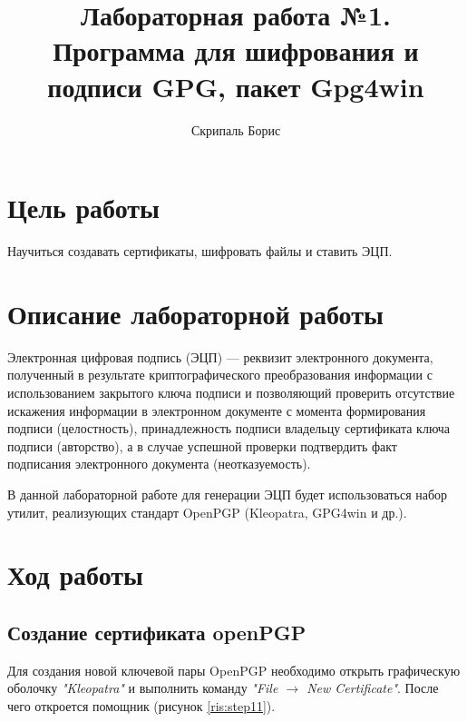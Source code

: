 \documentclass[10pt,a4paper]{report}
\author{Скрипаль Борис}
\title{Лабораторная работа №1.\\
	Программа для шифрования и подписи GPG, пакет Gpg4win}
\begin{document}
\maketitle
\renewcommand{\thesection}{\arabic{section}}
\tableofcontents
\pagebreak

\setcounter{totalnumber}{10}
\setcounter{topnumber}{10}
\setcounter{bottomnumber}{10}
\renewcommand{\topfraction}{1}
\renewcommand{\textfraction}{0}

\section{Цель работы}
Научиться создавать сертификаты, шифровать файлы и ставить ЭЦП.
\section{Описание лабораторной работы}
Электронная цифровая подпись (ЭЦП) — реквизит электронного документа, полученный в результате криптографического преобразования информации с использованием закрытого ключа подписи и позволяющий проверить отсутствие искажения информации в электронном документе с момента формирования подписи (целостность), принадлежность подписи владельцу сертификата ключа подписи (авторство), а в случае успешной проверки подтвердить факт подписания электронного документа (неотказуемость).

В данной лабораторной работе для генерации ЭЦП будет использоваться набор утилит, реализующих стандарт OpenPGP (Kleopatra, GPG4win и др.).
\section{Ход работы}
\subsection{Создание сертификата openPGP}
Для создания новой ключевой пары OpenPGP необходимо открыть графическую оболочку \textit{"Kleopatra"} и выполнить команду \textit{"File \begin{math}\to\end{math} New Certificate"}. После чего откроется помощник (рисунок \ref{ris:step11}).
\end{document}
